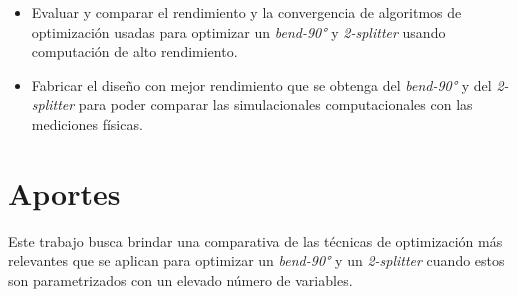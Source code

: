 \begin{itemize}

  \item Evaluar y comparar el rendimiento y la convergencia de algoritmos de optimización usadas para optimizar un \emph{bend-90°} y \emph{2-splitter} usando computación de alto rendimiento.

  \item Fabricar el diseño con mejor rendimiento que se obtenga del \emph{bend-90°} y del \emph{2-splitter} para poder comparar las simulacionales computacionales con las mediciones físicas.


\end{itemize}



\section{Aportes}

Este trabajo busca brindar una comparativa de las técnicas de optimización más relevantes que se aplican para optimizar un \emph{bend-90°} y un \emph{2-splitter} cuando estos son parametrizados con un elevado número de variables.
